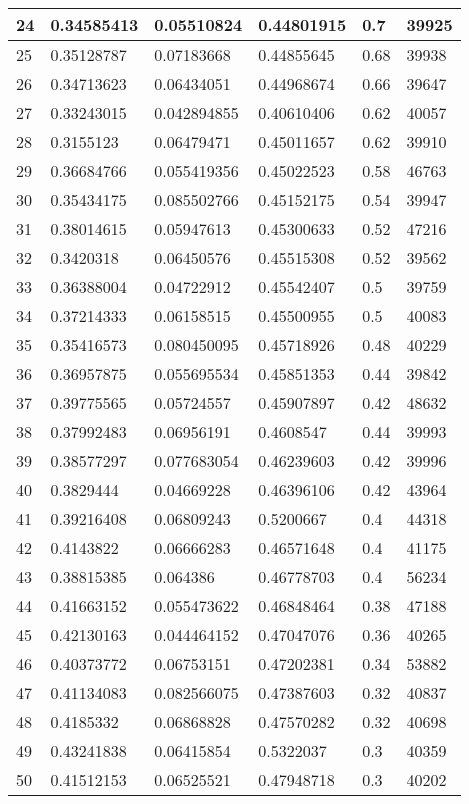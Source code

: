 \begin{longtable}{|l|l|l|l|l|l|}
24 & 0.34585413 & 0.05510824 & 0.44801915 & 0.7 & 39925 \\ \hline 
25 & 0.35128787 & 0.07183668 & 0.44855645 & 0.68 & 39938 \\ \hline 
26 & 0.34713623 & 0.06434051 & 0.44968674 & 0.66 & 39647 \\ \hline 
27 & 0.33243015 & 0.042894855 & 0.40610406 & 0.62 & 40057 \\ \hline 
28 & 0.3155123 & 0.06479471 & 0.45011657 & 0.62 & 39910 \\ \hline 
29 & 0.36684766 & 0.055419356 & 0.45022523 & 0.58 & 46763 \\ \hline 
30 & 0.35434175 & 0.085502766 & 0.45152175 & 0.54 & 39947 \\ \hline 
31 & 0.38014615 & 0.05947613 & 0.45300633 & 0.52 & 47216 \\ \hline 
32 & 0.3420318 & 0.06450576 & 0.45515308 & 0.52 & 39562 \\ \hline 
33 & 0.36388004 & 0.04722912 & 0.45542407 & 0.5 & 39759 \\ \hline 
34 & 0.37214333 & 0.06158515 & 0.45500955 & 0.5 & 40083 \\ \hline 
35 & 0.35416573 & 0.080450095 & 0.45718926 & 0.48 & 40229 \\ \hline 
36 & 0.36957875 & 0.055695534 & 0.45851353 & 0.44 & 39842 \\ \hline 
37 & 0.39775565 & 0.05724557 & 0.45907897 & 0.42 & 48632 \\ \hline 
38 & 0.37992483 & 0.06956191 & 0.4608547 & 0.44 & 39993 \\ \hline 
39 & 0.38577297 & 0.077683054 & 0.46239603 & 0.42 & 39996 \\ \hline 
40 & 0.3829444 & 0.04669228 & 0.46396106 & 0.42 & 43964 \\ \hline 
41 & 0.39216408 & 0.06809243 & 0.5200667 & 0.4 & 44318 \\ \hline 
42 & 0.4143822 & 0.06666283 & 0.46571648 & 0.4 & 41175 \\ \hline 
43 & 0.38815385 & 0.064386 & 0.46778703 & 0.4 & 56234 \\ \hline 
44 & 0.41663152 & 0.055473622 & 0.46848464 & 0.38 & 47188 \\ \hline 
45 & 0.42130163 & 0.044464152 & 0.47047076 & 0.36 & 40265 \\ \hline 
46 & 0.40373772 & 0.06753151 & 0.47202381 & 0.34 & 53882 \\ \hline 
47 & 0.41134083 & 0.082566075 & 0.47387603 & 0.32 & 40837 \\ \hline 
48 & 0.4185332 & 0.06868828 & 0.47570282 & 0.32 & 40698 \\ \hline 
49 & 0.43241838 & 0.06415854 & 0.5322037 & 0.3 & 40359 \\ \hline 
50 & 0.41512153 & 0.06525521 & 0.47948718 & 0.3 & 40202 \\ \hline 
\end{longtable}
